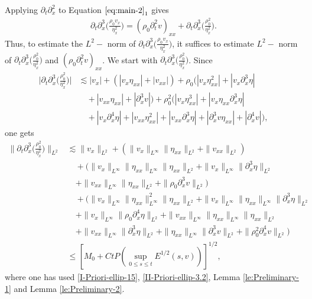 \documentclass[11pt, reqno]{amsart}
\numberwithin{equation}{section}
\begin{document}
{\bigskip
{} Applying \(\partial_t\partial_x^2\) to Equation \(\eqref{eq:main-2}_1\) gives
\begin{equation}\label{II-Priori-ellip-11.5}
\begin{aligned}
\partial_t\partial_x^3\bigg(\frac{\rho_0v_x}{\eta_x^2}\bigg)=(\rho_0\partial_t^2v)_{xx}
+\partial_t\partial_x^3\bigg(\frac{\rho_0^2}{\eta_x^2}\bigg).
\end{aligned}
\end{equation}
Thus, to estimate the \(L^2-\) norm of \(\partial_t\partial_x^3\big(\frac{\rho_0v_x}{\eta_x^2}\big)\), it suffices to estimate \(L^2-\) norm of \(\partial_t\partial_x^3\big({\frac{\rho_0^2}{\eta_x^2}}\big)\) and \((\rho_0\partial_t^2v)_{xx}\).
We start with \(\partial_t\partial_x^3\big({\frac{\rho_0^2}{\eta_x^2}}\big)\).
Since
\begin{equation*}
\begin{aligned}
\bigg|\partial_t\partial_x^3\bigg({\frac{\rho_0^2}{\eta_x^2}}\bigg)\bigg|
&\lesssim |v_x|+(|v_x\eta_{xx}|+|v_{xx}|)
+\rho_0(|v_x\eta_{xx}^2|+|v_x\partial_x^3\eta|\\
&\quad+|v_{xx}\eta_{xx}|+|\partial_x^3v|)
+\rho_0^2(|v_x\eta_{xx}^3|+|v_x\eta_{xx}\partial_x^3\eta|\\
&\quad+|v_x\partial_x^4\eta|+|v_{xx}\eta_{xx}^2|
+|v_{xx}\partial_x^3\eta|+|\partial_x^3v\eta_{xx}|+|\partial_x^4v|),
\end{aligned}
\end{equation*}
one gets
\begin{equation}\label{II-Priori-ellip-12}
\begin{aligned}
\bigg\|\partial_t\partial_x^3\bigg({\frac{\rho_0^2}{\eta_x^2}}\bigg)\bigg\|_{L^2}
&\lesssim \|v_x\|_{L^2}+(\|v_x\|_{L^\infty}\|\eta_{xx}\|_{L^2}+\|v_{xx}\|_{L^2})\\
&\quad+(\|v_x\|_{L^\infty}\|\eta_{xx}\|_{L^\infty}\|\eta_{xx}\|_{L^2}+\|v_x\|_{L^\infty}\|\partial_x^3\eta\|_{L^2}\\
&\quad+\|v_{xx}\|_{L^\infty}\|\eta_{xx}\|_{L^2}+
\|\rho_0\partial_x^3v\|_{L^2})\\
&\quad+(\|v_x\|_{L^\infty}\|\eta_{xx}\|_{L^\infty}^2\|\eta_{xx}\|_{L^2}+\|v_x\|_{L^\infty}\|\eta_{xx}\|_{L^\infty}\|\partial_x^3\eta\|_{L^2}\\
&\quad+\|v_x\|_{L^\infty}\|\rho_0\partial_x^4\eta\|_{L^2}
+\|v_{xx}\|_{L^\infty}\|\eta_{xx}\|_{L^\infty}\|\eta_{xx}\|_{L^2}\\
&\quad+\|v_{xx}\|_{L^\infty}\|\partial_x^3\eta\|_{L^2}+\|\eta_{xx}\|_{L^\infty}\|\partial_x^3v\|_{L^2}+\|\rho_0^2\partial_x^4v\|_{L^2})\\
&\leq [M_0+Ct P(\sup_{0\leq s\leq t}E^{1/2}(s,v))]^{1/2},
\end{aligned}
\end{equation}
where one has used \eqref{I-Priori-ellip-15}, \eqref{II-Priori-ellip-3.2}, Lemma \ref{le:Preliminary-1} and Lemma \ref{le:Preliminary-2}.

}
\end{document}

